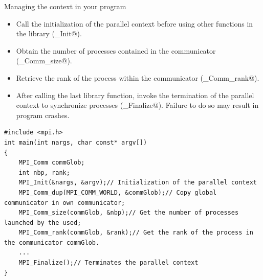 \documentclass[compress,10pt,aspectratio=169]{beamer}
\begin{document}
\begin{frame}[fragile]{Managing the context in your program}
    \small
    \begin{itemize}
        \item Call the initialization of the parallel context before using other functions in the library (\verb@MPI_Init@).
        \item Obtain the number of processes contained in the communicator (\verb@MPI_Comm_size@).
        \item Retrieve the rank of the process within the communicator (\verb@MPI_Comm_rank@).
        \item After calling the last library function, invoke the termination of the parallel context to synchronize processes (\verb@MPI_Finalize@). Failure to do so may result in program crashes.
    \end{itemize}

\begin{verbatim}
#include <mpi.h>
int main(int nargs, char const* argv[])
{
    MPI_Comm commGlob;
    int nbp, rank;
    MPI_Init(&nargs, &argv);// Initialization of the parallel context
    MPI_Comm_dup(MPI_COMM_WORLD, &commGlob);// Copy global communicator in own communicator;
    MPI_Comm_size(commGlob, &nbp);// Get the number of processes launched by the used;
    MPI_Comm_rank(commGlob, &rank);// Get the rank of the process in the communicator commGlob.
    ...
    MPI_Finalize();// Terminates the parallel context
}
\end{verbatim}

\end{frame}
\end{document}
